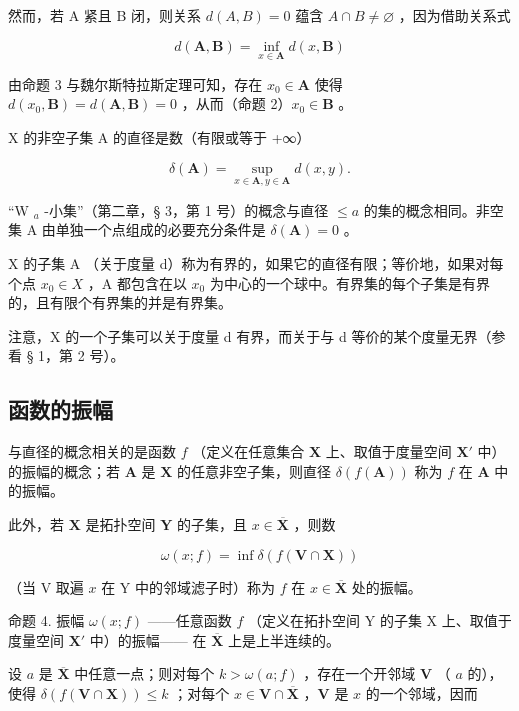 然而，若 A 紧且 B 闭，则关系 \(d(A, B) = 0\) 蕴含 \(A \cap B \neq \varnothing\) ，因为借助关系式

\[
d (\mathbf {A}, \mathbf {B}) = \inf _ {x \in \mathbf {A}} d (x, \mathbf {B})
\]

由命题 3 与魏尔斯特拉斯定理可知，存在 \(x_0 \in \mathbf{A}\) 使得 \(d(x_0, \mathbf{B}) = d(\mathbf{A}, \mathbf{B}) = 0\) ，从而（命题 2）\(x_0 \in \mathbf{B}\) 。

X 的非空子集 A 的直径是数（有限或等于 +∞）

\[
\delta (\mathbf {A}) = \sup _ {x \in \mathbf {A}, y \in \mathbf {A}} d (x, y).
\]

``W \(_{a}\) -小集''（第二章，§ 3，第 1 号）的概念与直径 \(\leqslant a\) 的集的概念相同。非空集 A 由单独一个点组成的必要充分条件是 \(\delta(\mathbf{A}) = 0\) 。

X 的子集 A （关于度量 d）称为有界的，如果它的直径有限；等价地，如果对每个点 \(x_{0} \in X\) ，A 都包含在以 \(x_{0}\) 为中心的一个球中。有界集的每个子集是有界的，且有限个有界集的并是有界集。

注意，X 的一个子集可以关于度量 d 有界，而关于与 d 等价的某个度量无界（参看 § 1，第 2 号）。

\subsection{函数的振幅}

与直径的概念相关的是函数 \(f\) （定义在任意集合 \(\mathbf{X}\) 上、取值于度量空间 \(\mathbf{X}'\) 中）的振幅的概念；若 \(\mathbf{A}\) 是 \(\mathbf{X}\) 的任意非空子集，则直径 \(\delta(f(\mathbf{A}))\) 称为 \(f\) 在 \(\mathbf{A}\) 中的振幅。

此外，若 \(\mathbf{X}\) 是拓扑空间 \(\mathbf{Y}\) 的子集，且 \(x \in \overline{\mathbf{X}}\) ，则数

\[
\omega (x; f) = \inf \delta (f (\mathbf {V} \cap \mathbf {X}))
\]

（当 V 取遍 \(x\) 在 Y 中的邻域滤子时）称为 \(f\) 在 \(x \in \overline{\mathbf{X}}\) 处的振幅。

命题 4. 振幅 \(\omega(x; f)\) ——任意函数 \(f\) （定义在拓扑空间 Y 的子集 X 上、取值于度量空间 \(\mathbf{X}'\) 中）的振幅—— 在 \(\overline{\mathbf{X}}\) 上是上半连续的。

设 \(a\) 是 \(\overline{\mathbf{X}}\) 中任意一点；则对每个 \(k > \omega(a; f)\) ，存在一个开邻域 \(\mathbf{V}\) （ \(a\) 的），使得 \(\delta(f(\mathbf{V} \cap \mathbf{X})) \leqslant k\) ；对每个 \(x \in \mathbf{V} \cap \overline{\mathbf{X}}\) ，\(\mathbf{V}\) 是 \(x\) 的一个邻域，因而

